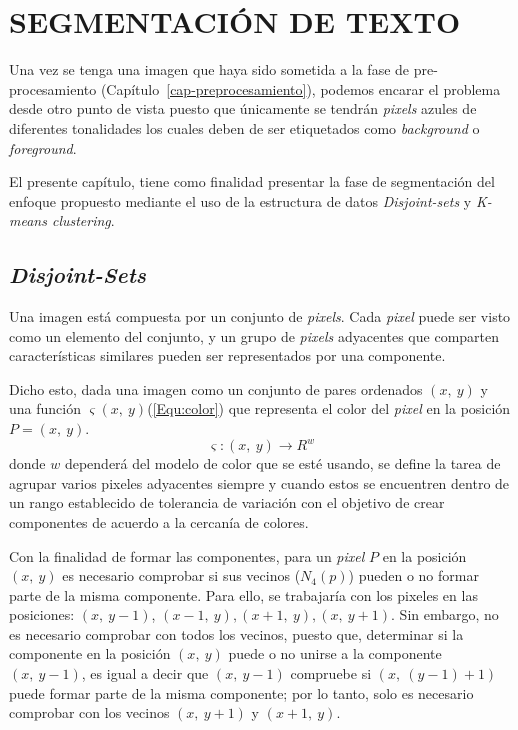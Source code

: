 \chapter{SEGMENTACIÓN DE TEXTO}
\label{cap-segmentacion}

\setcounter{secnumdepth}{0}

Una vez se tenga una imagen que haya sido sometida a la fase de pre-procesamiento
(Capítulo~\ref{cap-preprocesamiento}), podemos encarar el problema
desde otro punto de vista puesto que únicamente se tendrán \textit{pixels} 
azules de diferentes tonalidades los cuales deben de ser etiquetados como 
\textit{background} o \textit{foreground}.

El presente capítulo, tiene como finalidad presentar la fase de segmentación
del enfoque propuesto mediante el uso de la estructura de datos 
\textit{Disjoint-sets} y \textit{K-means clustering}.

\setcounter{secnumdepth}{3}
\section{\textit{Disjoint-Sets}}
Una imagen está compuesta por un conjunto de \textit{pixels}. Cada 
\textit{pixel} puede ser visto como un elemento del conjunto, y un grupo de 
\textit{pixels} adyacentes que comparten características similares pueden ser
 representados por una componente.

Dicho esto, dada una imagen como un conjunto de pares ordenados $(x,~y)$ y una 
función $\varsigma(x,~y)$(\ref{Equ:color}) que representa el color del 
\textit{pixel} en la posición $P=(x,~y)$.
\begin{equation}
	\varsigma:(x,~y) \rightarrow R^w
	\label{Equ:color}
\end{equation}
donde $w$ dependerá del modelo de color que se esté usando, se define la tarea
 de agrupar varios pixeles adyacentes siempre y cuando estos se encuentren 
 dentro de un rango establecido de tolerancia de variación con el objetivo de 
 crear componentes de acuerdo a la cercanía de colores.

Con la finalidad de formar las componentes, para un \textit{pixel} $P$ en la
 posición $(x,~y)$ es necesario comprobar si sus vecinos ($N_4(p)$) pueden o no
  formar parte de la misma componente. Para ello, se trabajaría con los pixeles 
  en las posiciones: $(x,~y - 1)$, $(x - 1,~y), (x + 1,~y), (x,~y + 1)$. Sin 
  embargo, no es necesario comprobar con todos los vecinos, puesto que, 
  determinar si la componente en la posición $(x,~y)$ puede o no unirse a la
   componente $(x,~ y - 1)$, es igual a decir que $(x,~ y - 1)$ compruebe si 
   $(x,~ (y - 1) + 1)$ puede formar parte de la misma componente; por lo tanto,
    solo es necesario comprobar con los vecinos $(x,~ y + 1)$ y $(x + 1,~ y)$.

